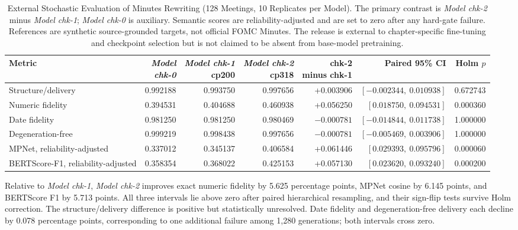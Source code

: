 \begin{table}[htbp]
    \centering
    \scriptsize
    \setlength{\tabcolsep}{2.7pt}
    \renewcommand{\arraystretch}{1.15}
    \begin{tabularx}{\textwidth}{@{}>{\raggedright\arraybackslash}Xrrrrrr@{}}
        \toprule
        \textbf{Metric} & \makecell{\textit{Model}\\\textit{chk-0}} &
        \makecell{\textit{Model chk-1}\\cp200} &
        \makecell{\textit{Model chk-2}\\cp318} &
        \makecell{chk-2\\minus chk-1} & \textbf{Paired 95\% CI} &
        \makecell{Holm\\$p$} \\
        \midrule
        Structure/delivery & 0.992188 & 0.993750 & 0.997656 & +0.003906 & $[-0.002344,\ 0.010938]$ & 0.672743 \\
        Numeric fidelity & 0.394531 & 0.404688 & 0.460938 & +0.056250 & $[0.018750,\ 0.094531]$ & 0.000360 \\
        Date fidelity & 0.981250 & 0.981250 & 0.980469 & $-0.000781$ & $[-0.014844,\ 0.011738]$ & 1.000000 \\
        Degeneration-free & 0.999219 & 0.998438 & 0.997656 & $-0.000781$ & $[-0.005469,\ 0.003906]$ & 1.000000 \\
        MPNet, reliability-adjusted & 0.337012 & 0.345137 & 0.406584 & +0.061446 & $[0.029393,\ 0.095796]$ & 0.000060 \\
        BERTScore-F1, reliability-adjusted & 0.358354 & 0.368022 & 0.425153 & +0.057130 & $[0.023620,\ 0.093240]$ & 0.000200 \\
        \bottomrule
    \end{tabularx}
    \caption{External Stochastic Evaluation of Minutes Rewriting (128 Meetings, 10 Replicates per Model). The primary contrast is \textit{Model chk-2} minus \textit{Model chk-1}; \textit{Model chk-0} is auxiliary. Semantic scores are reliability-adjusted and are set to zero after any hard-gate failure. References are synthetic source-grounded targets, not official FOMC Minutes. The release is external to chapter-specific fine-tuning and checkpoint selection but is not claimed to be absent from base-model pretraining.}
    \label{tab:ch2:minutes_external_n128_k10}
\end{table}

Relative to \textit{Model chk-1}, \textit{Model chk-2} improves exact numeric
fidelity by 5.625 percentage points, MPNet cosine by 6.145 points, and
BERTScore F1 by 5.713 points. All three intervals lie above zero after paired
hierarchical resampling, and their sign-flip tests survive Holm correction. The
structure/delivery difference is positive but statistically unresolved. Date
fidelity and degeneration-free delivery each decline by 0.078 percentage
points, corresponding to one additional failure among 1,280 generations; both
intervals cross zero.

